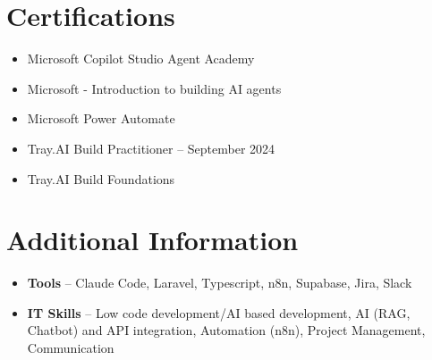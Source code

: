 \documentclass[a4paper,10pt]{article}
\begin{document}
\section{Certifications}
\begin{itemize}
\item Microsoft Copilot Studio Agent Academy
\item Microsoft - Introduction to building AI agents
\item Microsoft Power Automate
\item Tray.AI Build Practitioner -- September 2024
\item Tray.AI Build Foundations
\end{itemize}

\section{Additional Information}
\begin{itemize}
\item \textbf{Tools} -- Claude Code, Laravel, Typescript, n8n, Supabase, Jira, Slack
\item \textbf{IT Skills} -- Low code development/AI based development, AI (RAG, Chatbot) and API integration, Automation (n8n), Project Management, Communication
\end{itemize}
\end{document}
